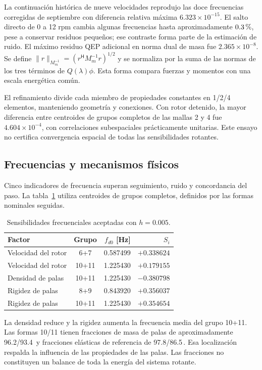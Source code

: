 \documentclass[11pt,a4paper]{article}
\begin{document}
La continuación histórica de nueve velocidades reprodujo las doce frecuencias corregidas de septiembre con diferencia relativa máxima $6.323\times10^{-15}$. El salto directo de 0 a 12 rpm cambia algunas frecuencias hasta aproximadamente $0.3\,\text{\char37}$, pese a conservar residuos pequeños; ese contraste forma parte de la estimación de ruido. El máximo residuo QEP adicional en norma dual de masa fue $2.365\times10^{-8}$. Se define $\|r\|_{M_m^{-1}}=(r^{\mathsf H}M_m^{-1}r)^{1/2}$ y se normaliza por la suma de las normas de los tres términos de $Q(\lambda)\phi$. Esta forma compara fuerzas y momentos con una escala energética común.

El refinamiento divide cada miembro de propiedades constantes en 1/2/4 elementos, manteniendo geometría y conexiones. Con rotor detenido, la mayor diferencia entre centroides de grupos completos de las mallas 2 y 4 fue $4.604\times10^{-4}$, con correlaciones subespaciales prácticamente unitarias. Este ensayo no certifica convergencia espacial de todas las sensibilidades rotantes.

\subsection{Frecuencias y mecanismos físicos}
Cinco indicadores de frecuencia superan seguimiento, ruido y concordancia del paso. La tabla~\ref{tab:freq} utiliza centroides de grupos completos, definidos por las formas nominales seguidas.

\begin{table}[htbp]
\centering
\caption{Sensibilidades frecuenciales aceptadas con $h=0.005$.}\label{tab:freq}
\begin{tabular}{lcrr}
\toprule
Factor & Grupo & $f_{d0}$ [Hz] & $S_i$\\
\midrule
Velocidad del rotor & 6+7 & 0.587499 & $+0.338624$\\
Velocidad del rotor & 10+11 & 1.225430 & $+0.179155$\\
Densidad de palas & 10+11 & 1.225430 & $-0.380798$\\
Rigidez de palas & 8+9 & 0.843920 & $+0.356037$\\
Rigidez de palas & 10+11 & 1.225430 & $+0.354654$\\
\bottomrule
\end{tabular}
\end{table}

La densidad reduce y la rigidez aumenta la frecuencia media del grupo 10+11. Las formas 10/11 tienen fracciones de masa de palas de aproximadamente 96.2/93.4\, y fracciones elásticas de referencia de 97.8/86.5\,. Esa localización respalda la influencia de las propiedades de las palas. Las fracciones no constituyen un balance de toda la energía del sistema rotante.
\end{document}
